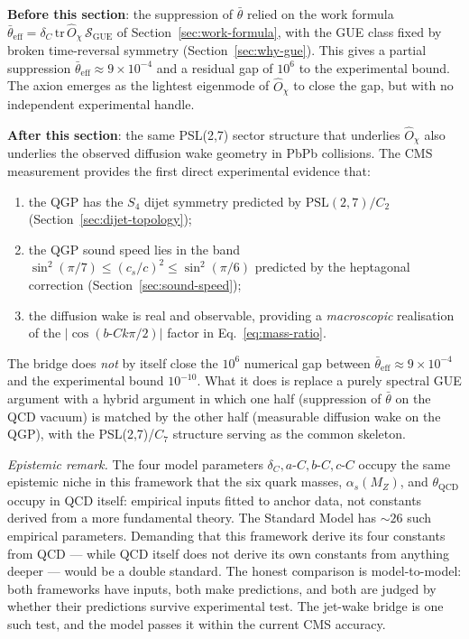 \documentclass[11pt,a4paper]{article}
\newcommand{\dC}{\delta_C}
\newcommand{\aC}{a\text{-}C}
\newcommand{\bC}{b\text{-}C}
\newcommand{\cC}{c\text{-}C}
\newcommand{\PSL}{\mathrm{PSL}}
\providecommand{\tr}{}
\renewcommand{\tr}{\mathrm{tr}}
\theoremstyle{plain}
\theoremstyle{definition}
\theoremstyle{remark}
\begin{document}
\begin{verdict}
\textbf{Before this section}: the suppression of $\bar\theta$ relied
on the work formula
$\bar\theta_{\mathrm{eff}} = \dC\,\tr\,\hat{O}_\chi\,\mathcal{S}_{\mathrm{GUE}}$
of Section~\ref{sec:work-formula}, with the GUE class fixed by broken
time-reversal symmetry (Section~\ref{sec:why-gue}).  This gives a
partial suppression $\bar\theta_{\mathrm{eff}} \approx 9\times 10^{-4}$
and a residual gap of $10^{6}$ to the experimental bound.  The axion
emerges as the lightest eigenmode of $\hat{O}_\chi$ to close the gap,
but with no independent experimental handle.

\textbf{After this section}: the same PSL(2,7) sector structure that
underlies $\hat{O}_\chi$ also underlies the observed diffusion wake
geometry in PbPb collisions.  The CMS measurement provides the first
direct experimental evidence that:
\begin{enumerate}[leftmargin=2em,itemsep=2pt]
  \item the QGP has the $S_4$ dijet symmetry predicted by
        $\PSL(2,7)/C_2$ (Section~\ref{sec:dijet-topology});
  \item the QGP sound speed lies in the band
        $\sin^2(\pi/7) \le (c_s/c)^2 \le \sin^2(\pi/6)$ predicted by
        the heptagonal correction (Section~\ref{sec:sound-speed});
  \item the diffusion wake is real and observable, providing a
        \emph{macroscopic} realisation of the $|\cos(\bC k\pi/2)|$
        factor in Eq.~\eqref{eq:mass-ratio}.
\end{enumerate}
The bridge does \emph{not} by itself close the $10^{6}$ numerical gap
between $\bar\theta_{\mathrm{eff}} \approx 9\times 10^{-4}$ and the
experimental bound $10^{-10}$.  What it does is replace a purely
spectral GUE argument with a hybrid argument in which one half
(suppression of $\bar\theta$ on the QCD vacuum) is matched by the
other half (measurable diffusion wake on the QGP), with the
PSL(2,7)/$C_7$ structure serving as the common skeleton.

\smallskip\noindent\textit{Epistemic remark.}  The four model
parameters $\dC, \aC, \bC, \cC$ occupy the same epistemic niche
in this framework that the six quark masses, $\alpha_s(M_Z)$, and
$\theta_{\mathrm{QCD}}$ occupy in QCD itself: empirical inputs
fitted to anchor data, not constants derived from a more
fundamental theory.  The Standard Model has $\sim 26$ such
empirical parameters.  Demanding that this framework derive its
four constants from QCD --- while QCD itself does not derive its
own constants from anything deeper --- would be a double
standard.  The honest comparison is model-to-model: both
frameworks have inputs, both make predictions, and both are
judged by whether their predictions survive experimental test.
The jet-wake bridge is one such test, and the model passes it
within the current CMS accuracy.
\end{verdict}
\end{document}
